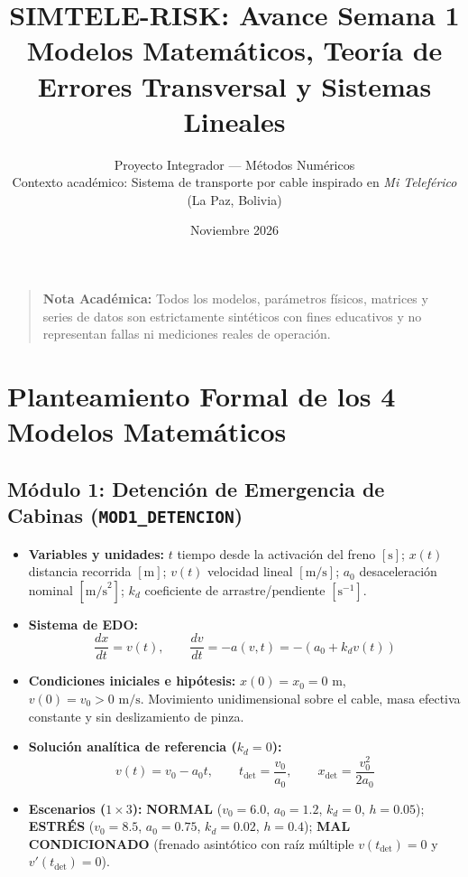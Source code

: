 \documentclass[11pt,a4paper]{article}
\title{\textbf{SIMTELE-RISK: Avance Semana 1} \\
\large Modelos Matemáticos, Teoría de Errores Transversal y Sistemas Lineales}
\author{Proyecto Integrador — Métodos Numéricos \\
Contexto académico: Sistema de transporte por cable inspirado en \textit{Mi Teleférico} (La Paz, Bolivia)}
\date{Noviembre 2026}
\begin{document}
\maketitle

\begin{quote}
\textbf{Nota Académica:} Todos los modelos, parámetros físicos, matrices y series de datos son estrictamente sintéticos con fines educativos y no representan fallas ni mediciones reales de operación.
\end{quote}

\tableofcontents
\newpage

\section{Planteamiento Formal de los 4 Modelos Matemáticos}

\subsection{Módulo 1: Detención de Emergencia de Cabinas (\texttt{MOD1\_DETENCION})}
\begin{itemize}
    \item \textbf{Variables y unidades:} $t$ tiempo desde la activación del freno $[\text{s}]$; $x(t)$ distancia recorrida $[\text{m}]$; $v(t)$ velocidad lineal $[\text{m/s}]$; $a_0$ desaceleración nominal $[\text{m/s}^2]$; $k_d$ coeficiente de arrastre/pendiente $[\text{s}^{-1}]$.
    \item \textbf{Sistema de EDO:}
    \[
        \frac{dx}{dt} = v(t), \qquad \frac{dv}{dt} = -a(v,t) = -(a_0 + k_d v(t))
    \]
    \item \textbf{Condiciones iniciales e hipótesis:} $x(0)=x_0=0\text{ m}$, $v(0)=v_0 > 0\text{ m/s}$. Movimiento unidimensional sobre el cable, masa efectiva constante y sin deslizamiento de pinza.
    \item \textbf{Solución analítica de referencia ($k_d = 0$):}
    \[
        v(t) = v_0 - a_0 t, \qquad t_{\text{det}} = \frac{v_0}{a_0}, \qquad x_{\text{det}} = \frac{v_0^2}{2a_0}
    \]
    \item \textbf{Escenarios ($1\times 3$):} \textbf{NORMAL} ($v_0=6.0$, $a_0=1.2$, $k_d=0$, $h=0.05$); \textbf{ESTRÉS} ($v_0=8.5$, $a_0=0.75$, $k_d=0.02$, $h=0.4$); \textbf{MAL CONDICIONADO} (frenado asintótico con raíz múltiple $v(t_{\text{det}})=0$ y $v'(t_{\text{det}})=0$).
\end{itemize}
\end{document}
